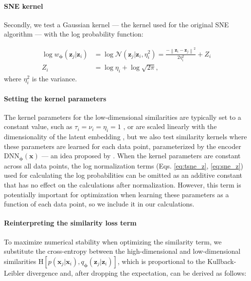 \documentclass[11pt,a4paper,oneside]{book}
\begin{document}
\begin{appendices}
\paragraph{SNE kernel} Secondly, we test a Gaussian kernel --- the kernel used for the original SNE algorithm \citep{hinton2003stochastic, maaten2008tsne} --- with the log probability function:

\begin{subequations}
    \begin{align}
        \log w_{\boldsymbol{\phi}}(\mathbf{z}_j | \mathbf{z}_i) &= \log \mathcal{N}(\mathbf{z}_j | \mathbf{z}_i, \eta_i^{2}) = \frac{-\left\|\mathbf{z}_{i} - \mathbf{z}_{j} \right\|^{2}}{2 \eta_i^{2}} + Z_i \label{eq:sne_logp}\\
        Z_i &= \log\eta_i + \log\sqrt{2 \pi} \label{eq:sne_z},
    \end{align}
\end{subequations}
where $\eta_i^2$ is the variance. 

\paragraph{Setting the kernel parameters} The kernel parameters for the low-dimensional similarities are typically set to a constant value, such as $\tau_i = \nu_i = \eta_i = 1$ \citep{maaten2008tsne}, or are scaled linearly with the dimensionality of the latent embedding \citep{van2009ptsne}, but we also test similarity kernels where these parameters are learned for each data point, parameterized by the encoder $\mathrm{DNN}_{\boldsymbol{\phi}}(\mathbf{x})$ --- an idea proposed by \cite{van2009ptsne}. When the kernel parameters are constant across all data points, the log normalization terms (Eqs. \ref{eq:tsne_z}, \ref{eq:sne_z}) used for calculating the log probabilities can be omitted as an additive constant that has no effect on the calculations after normalization. However, this term is potentially important for optimization when learning these parameters as a function of each data point, so we include it in our calculations.

\paragraph{Reinterpreting the similarity loss term} To maximize numerical stability when optimizing the similarity term, we substitute the cross-entropy between the high-dimensional and low-dimensional similarities $\mathrm{H}[p(\mathbf{x}_j | \mathbf{x}_i), q_{\boldsymbol{\phi}}(\mathbf{z}_j | \mathbf{z}_i)]$, which is proportional to the Kullback-Leibler divergence and, after dropping the expectation, can be derived as follows:


\end{appendices}
\end{document}
